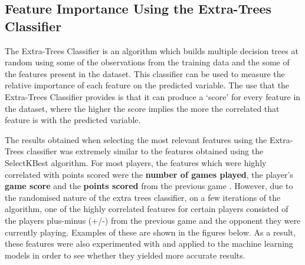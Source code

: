 \documentclass[a4paper,11pt,twoside]{article}
\begin{document}
 \subsection{Feature Importance Using the Extra-Trees Classifier}
 The Extra-Trees Classifier is an algorithm which builds multiple decision trees at random using some of the observations from the training data and the some of the features present in the dataset. This classifier can be used to measure the relative importance of each feature on the predicted variable. The use that the Extra-Trees Classifier provides is that it can produce a `score' for every feature in the dataset, where the higher the score implies the more the correlated that feature is with the predicted variable.
 
The results obtained when selecting the most relevant features using the Extra-Trees classifier was extremely similar to the features obtained using the SelectKBest algorithm. For most players, the features which were highly correlated with points scored were the \textbf{number of games played}, the player's \textbf{game score} and the \textbf{points scored} from the previous game . However, due to the randomised nature of the extra trees classifier, on a few iterations of the algorithm, one of the highly correlated features for certain players consisted of the players plus-minus (+/-) from the previous game and the opponent they were currently playing. Examples of these are shown in the figures below. As a result, these features were also experimented with and applied to the machine learning models in order to see whether they yielded more accurate results.
\end{document}
